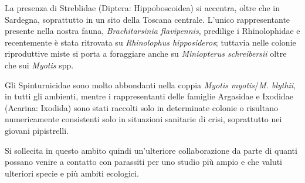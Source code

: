 {La presenza di Streblidae (Diptera: Hippoboscoidea) si accentra, oltre che in Sardegna, soprattutto in un sito della Toscana centrale. L’unico rappresentante presente nella nostra fauna, \emph{Brachitarsinia flavipennis}, predilige i Rhinolophidae e recentemente è stata ritrovata su \emph{Rhinolophus hipposideros}; tuttavia nelle colonie riproduttive miste si porta a foraggiare anche su \emph{Miniopterus schreibersii} oltre che sui \emph{Myotis} spp.

Gli Spinturnicidae sono molto abbondanti nella coppia \emph{Myotis myotis}/\emph{M. blythii}, in tutti gli ambienti, mentre i rappresentanti delle famiglie Argasidae e Ixodidae (Acarina: Ixodida) sono stati raccolti solo in determinate colonie o risultano numericamente consistenti solo in situazioni sanitarie di crisi, soprattutto nei giovani pipistrelli.

Si sollecita in questo ambito quindi un’ulteriore collaborazione da parte di quanti possano venire a contatto con parassiti per uno studio più ampio e che valuti ulteriori specie e più ambiti ecologici.
} %